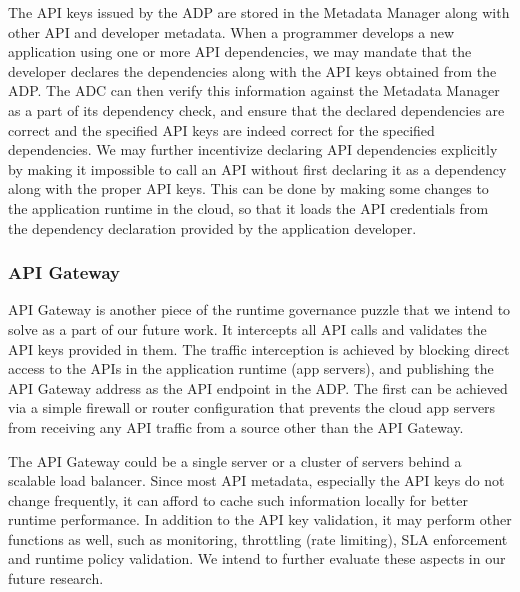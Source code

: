 The API keys issued by the ADP are stored in the Metadata Manager along with other API and developer metadata. When a programmer develops a new application
using one or more API dependencies, we may mandate that the developer declares the dependencies along with the API keys obtained from the ADP. The ADC
can then verify this information against the Metadata Manager as a part of its dependency check, and ensure that the declared dependencies are correct and 
the specified API keys are indeed correct for the specified dependencies. We may further incentivize declaring API dependencies explicitly by making it 
impossible to call an API without first declaring it as a dependency along with the proper API keys. This can be done by making some changes to the application
runtime in the cloud, so that it loads the API credentials from the dependency declaration provided by the application developer.

\subsubsection{API Gateway}
API Gateway is another piece of the runtime governance puzzle that we intend to solve as a part of our future work. It intercepts all API calls and validates the API
keys provided in them. The traffic interception is achieved by blocking direct access to the APIs in the application runtime (app servers), and publishing the API 
Gateway address as the API endpoint in the ADP. The first can be achieved via a simple firewall or router configuration that prevents the cloud app servers from 
receiving any API traffic from a source other than the API Gateway.

The API Gateway could be a single server or a cluster of servers behind a scalable load balancer. Since most API metadata, especially the API keys do not change
frequently, it can afford to cache such information locally for better runtime performance. In addition to the API key validation, it may perform other
functions as well, such as monitoring, throttling (rate limiting), SLA enforcement and runtime policy validation. We intend to further evaluate these aspects
in our future research.